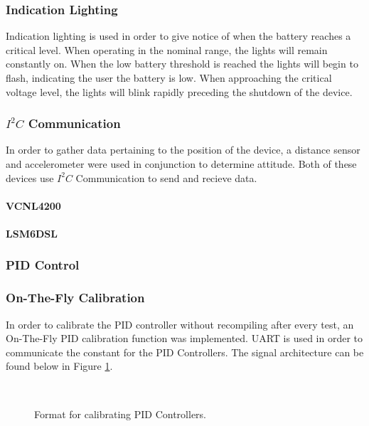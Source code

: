 \documentclass{hitec}
\begin{document}
	\subsubsection{Indication Lighting}
	Indication lighting is used in order to give notice of when the battery reaches a critical level. When operating in the nominal range, the lights will remain constantly on. When the low battery threshold is reached the lights will begin to flash, indicating the user the battery is low. When approaching the critical voltage level, the lights will blink rapidly preceding the shutdown of the device. 
	\subsubsection{$I^{2}C$ Communication}
	In order to gather data pertaining to the position of the device, a distance sensor and accelerometer were used in conjunction to determine attitude. Both of these devices use $I^{2}C$ Communication to send and recieve data. 
	\paragraph{VCNL4200}
	\paragraph{LSM6DSL}
	\subsubsection{PID Control}
	\subsubsection{On-The-Fly Calibration}
	In order to calibrate the PID controller without recompiling after every test, an On-The-Fly PID calibration function was implemented. UART is used in order to communicate the constant for the PID Controllers. The signal architecture can be found below in Figure \ref{fig: PIDarchitecture}.
	
	\begin{figure}[ht]
		\begin{bytefield}[bitwidth = \linewidth / 72]{72}
			\\
				\end{bytefield}
		\caption{Format for calibrating PID Controllers.}
		\label{fig: PIDarchitecture}
	\end{figure}
\end{document}
